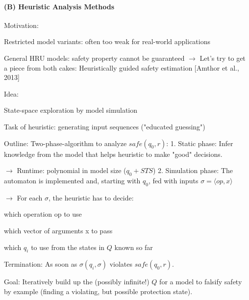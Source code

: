 \documentclass[a4paper]{article}
\begin{document}
\begin{multicols}{3}
    \paragraph{(B) Heuristic Analysis Methods}
    Motivation:
    \begin{itemize*}
        \item Restricted model variants: often too weak for real-world applications
        \item General HRU models: safety property cannot be guaranteed $\rightarrow$ Let’s try to get a piece from both cakes: Heuristically guided safety estimation [Amthor et al., 2013]
    \end{itemize*}

    Idea:
    \begin{itemize*}
        \item State-space exploration by model simulation
        \item Task of heuristic: generating input sequences ("educated guessing")
    \end{itemize*}

    Outline: Two-phase-algorithm to analyze $safe(q_0,r)$:
    1. Static phase: Infer knowledge from the model that helps heuristic to make "good" decisions.
    \begin{itemize*}
        \item $\rightarrow$  Runtime: polynomial in model size ($q_0 + STS$)
              2. Simulation phase: The automaton is implemented and, starting with $q_0$, fed with inputs $\sigma=⟨op,x⟩$
              \begin{itemize*}
                  \item $\rightarrow$  For each $\sigma$, the heuristic has to decide:
                        \begin{itemize*}
                            \item which operation op to use
                            \item which vector of arguments x to pass
                            \item which $q_i$ to use from the states in $Q$ known so far
                        \end{itemize*}
                  \item Termination: As soon as $\sigma(q_i,\sigma)$ violates $safe(q_0,r)$.
              \end{itemize*}
    \end{itemize*}

    Goal: Iteratively build up the (possibly infinite!) $Q$ for a model to falsify safety by example (finding a violating, but possible protection state).


\end{multicols}
\end{document}
